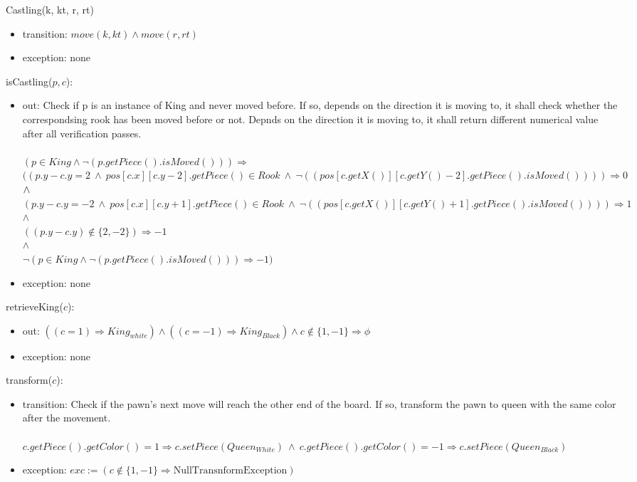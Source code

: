 \documentclass[12pt]{article}
\begin{document}
\noindent Castling(k, kt,  r, rt) {
\begin{itemize}
\item transition: $move(k, kt) \wedge move(r, rt)$
\item exception: none
\end{itemize}

\noindent isCastling($p, c$):
\begin{itemize}
\item out: Check if p is an instance of King and never moved before. If so, depends on the direction it is moving to, it shall check whether the correspondsing rook has been moved before or not. Depnds on the direction it is moving to, it shall return different numerical value after all verification passes.\\
\\
$(p \in King \wedge \neg(p.getPiece().isMoved())) \Rightarrow$\\
$((p.y-c.y = 2\ \wedge\  pos[c.x][c.y-2].getPiece() \in Rook\ \wedge \  \neg((pos[c.getX()][c.getY()-2].getPiece().isMoved()))) \Rightarrow 0$ \\
$\wedge \\ $
$(p.y-c.y = -2\ \wedge\  pos[c.x][c.y+1].getPiece() \in Rook\ \wedge \  \neg((pos[c.getX()][c.getY()+1].getPiece().isMoved()))) \Rightarrow 1$ \\
$\wedge$ \\ 
$((p.y - c.y) \not\in \{2,-2\}) \Rightarrow -1$ \\
$\wedge$ \\ 
$\neg (p \in King \wedge \neg(p.getPiece().isMoved())) \Rightarrow -1) $\\ 
\item exception:  none
\end{itemize}

\noindent retrieveKing($c$):
\begin{itemize}
\item out: $((c = 1) \Rightarrow King_{white}) \wedge ((c = -1) \Rightarrow King_{Black}) \wedge c \not\in \{1,-1\} \Rightarrow \phi$
\item exception: none
\end{itemize}

\noindent transform($c$):
\begin{itemize}
\item transition: Check if the pawn's next move will reach the other end of the board. If so, transform the pawn to queen with the same color after the movement. \\
\\
$c.getPiece().getColor() = 1 \Rightarrow c.setPiece(Queen_{White})\  \wedge \  c.getPiece().getColor() = -1 \Rightarrow c.setPiece(Queen_{Black})$
\item exception: $exc := (c \not\in \{1,-1\} \Rightarrow \mathrm{NullTransnformException})$
\end{itemize}


}
\end{document}
